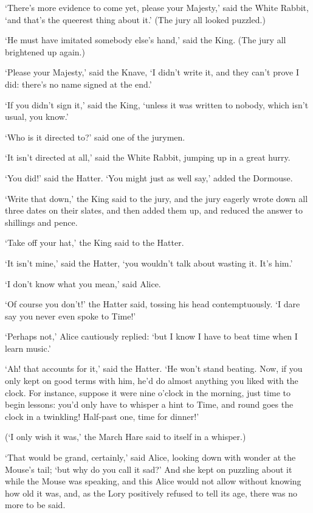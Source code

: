 \documentclass[statementpaper,twoside,openany]{memoir}
\begin{document}
`There's more evidence to come yet, please your Majesty,' said the White Rabbit, `and that's the queerest thing about it.' (The jury all looked puzzled.)

`He must have imitated somebody else's hand,' said the King. (The jury all brightened up again.)

`Please your Majesty,' said the Knave, `I didn't write it, and they can't prove I did: there's no name signed at the end.'

`If you didn't sign it,' said the King, `unless it was written to nobody, which isn't usual, you know.'

`Who is it directed to?' said one of the jurymen.

`It isn't directed at all,' said the White Rabbit, jumping up in a great hurry.

`You did!' said the Hatter. `You might just as well say,' added the Dormouse.

`Write that down,' the King said to the jury, and the jury eagerly wrote down all three dates on their slates, and then added them up, and reduced the answer to shillings and pence.

`Take off your hat,' the King said to the Hatter.

`It isn't mine,' said the Hatter, `you wouldn't talk about wasting it. It's him.'

`I don't know what you mean,' said Alice.

`Of course you don't!' the Hatter said, tossing his head contemptuously. `I dare say you never even spoke to Time!'

`Perhaps not,' Alice cautiously replied: `but I know I have to beat time when I learn music.'

`Ah! that accounts for it,' said the Hatter. `He won't stand beating. Now, if you only kept on good terms with him, he'd do almost anything you liked with the clock. For instance, suppose it were nine o'clock in the morning, just time to begin lessons: you'd only have to whisper a hint to Time, and round goes the clock in a twinkling! Half-past one, time for dinner!'

(`I only wish it was,' the March Hare said to itself in a whisper.)

`That would be grand, certainly,' said Alice, looking down with wonder at the Mouse's tail; `but why do you call it sad?' And she kept on puzzling about it while the Mouse was speaking, and this Alice would not allow without knowing how old it was, and, as the Lory positively refused to tell its age, there was no more to be said.
\end{document}
